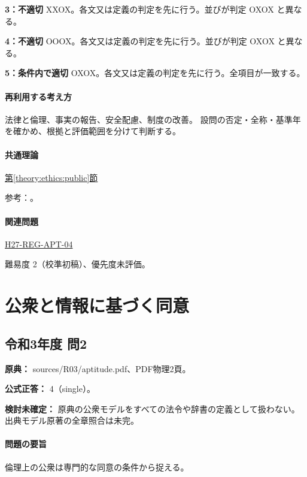 \noindent\textbf{3：不適切} XXOX。各文又は定義の判定を先に行う。並びが判定 OXOX と異なる。\par

\noindent\textbf{4：不適切} OOOX。各文又は定義の判定を先に行う。並びが判定 OXOX と異なる。\par

\noindent\textbf{5：条件内で適切} OXOX。各文又は定義の判定を先に行う。全項目が一致する。\par

\paragraph{再利用する考え方} 法律と倫理、事実の報告、安全配慮、制度の改善。 設問の否定・全称・基準年を確かめ、根拠と評価範囲を分けて判断する。

\paragraph{共通理論} \hyperref[theory:ethics:public]{第\ref*{theory:ethics:public}節}

\par 参考：\cite{ipej_ethics2011}。

\paragraph{関連問題} \hyperref[q:h27-reg-apt-04]{H27-REG-APT-04}

\par 難易度 2（校準初稿）、優先度未評価。

\section{公衆と情報に基づく同意}

\subsection{令和3年度 問2}
\label{q:r03-reg-apt-02}

\noindent\textbf{原典：} sources/R03/aptitude.pdf、PDF物理2頁。

\textbf{公式正答：} 4（single）。

\par\textbf{検討未確定：} 原典の公衆モデルをすべての法令や辞書の定義として扱わない。出典モデル原著の全章照合は未完。

\paragraph{問題の要旨} 倫理上の公衆は専門的な同意の条件から捉える。

